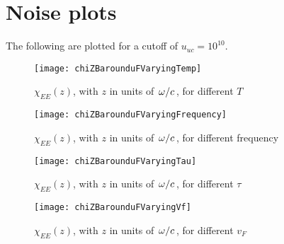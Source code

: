 \documentclass[11pt]{article}
\begin{document}
	\section{Noise plots} \label{sec:plots}

	The following are plotted for a cutoff of $u_{uc} = 10^{10}$.

	\begin{figure}[htp]
		\centering
		\texttt{[image: chiZBarounduFVaryingTemp]}
		\caption{$\chi_{EE}(z)$, with $z$ in units of $\flatfrac{\omega}{c}$, for different $T$} \label{fig:temp}
	\end{figure}

	\begin{figure}[htp]
		\centering
		\texttt{[image: chiZBarounduFVaryingFrequency]}
		\caption{$\chi_{EE}(z)$, with $z$ in units of $\flatfrac{\omega}{c}$, for different frequency} \label{fig:frequency}
	\end{figure}

	\begin{figure}[htp]
		\centering
		\texttt{[image: chiZBarounduFVaryingTau]}
		\caption{$\chi_{EE}(z)$, with $z$ in units of $\flatfrac{\omega}{c}$, for different $\tau$} \label{fig:tau}
	\end{figure}

	\begin{figure}[htp]
		\centering
		\texttt{[image: chiZBarounduFVaryingVf]}
		\caption{$\chi_{EE}(z)$, with $z$ in units of $\flatfrac{\omega}{c}$, for different $v_F$} \label{fig:vf}
	\end{figure}

	\newpage
	\listoftodos
	\newpage
	\printbibliography
\end{document}
